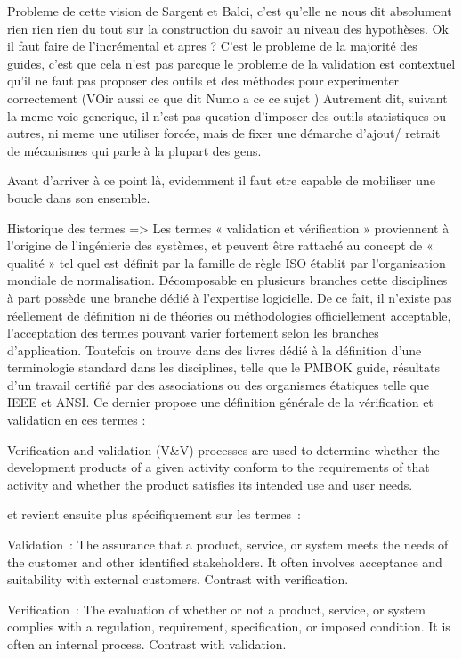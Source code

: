 Probleme de cette vision de Sargent et Balci, c'est qu'elle ne nous dit absolument rien rien rien du tout sur la construction du savoir au niveau des hypothèses. Ok il faut faire de l'incrémental et apres ? C'est le probleme de la majorité des guides, c'est que cela n'est pas parcque le probleme de la validation est contextuel qu'il ne faut pas proposer des outils et des méthodes pour experimenter correctement (VOir aussi ce que dit Numo a ce ce sujet )
Autrement dit, suivant la meme voie generique, il n'est pas question d'imposer des outils statistiques ou autres, ni meme une utiliser forcée, mais de fixer une démarche d'ajout/ retrait de mécanismes qui parle à la plupart des gens.

Avant d'arriver à ce point là, evidemment il faut etre capable de mobiliser une boucle dans son ensemble.


Historique des termes => Les termes « validation et vérification » proviennent à l'origine de l'ingénierie des systèmes, et peuvent être rattaché au concept de « qualité » tel quel est définit par la famille de règle ISO établit par l'organisation mondiale de normalisation. Décomposable en plusieurs branches cette disciplines à part possède une branche dédié à l'expertise logicielle. De ce fait, il n'existe pas réellement de définition ni de théories ou méthodologies officiellement acceptable, l'acceptation des termes pouvant varier fortement selon les branches d'application. Toutefois on trouve dans des livres dédié à la définition d'une terminologie standard dans les disciplines, telle que le {PMBOK guide}, résultats d'un travail certifié par des associations ou des organismes étatiques telle que IEEE et ANSI. Ce dernier propose une définition générale de la vérification et validation en ces termes : 

Verification and validation (V\&V) processes are used to determine whether the development products of a given activity conform to the requirements of that activity and whether the product satisfies its intended use and user needs. 

et revient ensuite plus spécifiquement sur les termes : 

Validation : The assurance that a product, service, or system meets the needs of the customer and other identified stakeholders. It often involves acceptance and suitability with external customers. Contrast with verification.

Verification : The evaluation of whether or not a product, service, or system complies with a regulation, requirement, specification, or imposed condition. It is often an internal process. Contrast with validation.

